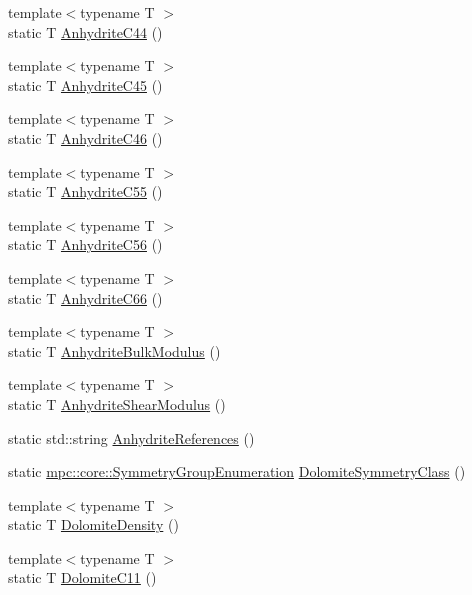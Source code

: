\begin{DoxyCompactItemize}
{\footnotesize template$<$typename T $>$ }\\static T \mbox{\hyperlink{namespacempc_1_1data_ac9ea2728857d2be154ad5b3f89d03ec8}{Anhydrite\+C44}} ()
\item 
{\footnotesize template$<$typename T $>$ }\\static T \mbox{\hyperlink{namespacempc_1_1data_abf917b564b0504dcd31e3066859037a5}{Anhydrite\+C45}} ()
\item 
{\footnotesize template$<$typename T $>$ }\\static T \mbox{\hyperlink{namespacempc_1_1data_af03a6421742d20f8b35688da2b7dcc30}{Anhydrite\+C46}} ()
\item 
{\footnotesize template$<$typename T $>$ }\\static T \mbox{\hyperlink{namespacempc_1_1data_a44d4f0fa5980f4ff77f3a405ec8b2c92}{Anhydrite\+C55}} ()
\item 
{\footnotesize template$<$typename T $>$ }\\static T \mbox{\hyperlink{namespacempc_1_1data_a7d6b77316e9c918bd1041517f00d753c}{Anhydrite\+C56}} ()
\item 
{\footnotesize template$<$typename T $>$ }\\static T \mbox{\hyperlink{namespacempc_1_1data_a30eff05a8a6ddadbb053243665a74395}{Anhydrite\+C66}} ()
\item 
{\footnotesize template$<$typename T $>$ }\\static T \mbox{\hyperlink{namespacempc_1_1data_aa6c97d6399acedca0c1928578980db78}{Anhydrite\+Bulk\+Modulus}} ()
\item 
{\footnotesize template$<$typename T $>$ }\\static T \mbox{\hyperlink{namespacempc_1_1data_a61c625309889da81f4e7cf2fe4afe974}{Anhydrite\+Shear\+Modulus}} ()
\item 
static std\+::string \mbox{\hyperlink{namespacempc_1_1data_a93b4437efd22e56d3b44e9589561ef38}{Anhydrite\+References}} ()
\item 
static \mbox{\hyperlink{namespacempc_1_1core_a9d979684062547055a0ef5c13077bad8}{mpc\+::core\+::\+Symmetry\+Group\+Enumeration}} \mbox{\hyperlink{namespacempc_1_1data_ac3b4fa976ac3ee6d65fa75caeab84383}{Dolomite\+Symmetry\+Class}} ()
\item 
{\footnotesize template$<$typename T $>$ }\\static T \mbox{\hyperlink{namespacempc_1_1data_adddf5f5e62913d6a4cf88eef02d0efd5}{Dolomite\+Density}} ()
\item 
{\footnotesize template$<$typename T $>$ }\\static T \mbox{\hyperlink{namespacempc_1_1data_a99af38f08d4e63a29e45e6495c2af985}{Dolomite\+C11}} ()

\end{DoxyCompactItemize}

